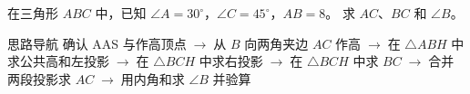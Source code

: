 \documentclass{exam-zh}
\begin{document}




\begin{eduProblemBlock}[例题]
\noindent
\begin{minipage}[t]{\dimexpr\linewidth-70mm-6mm\relax}
\vspace{0pt}
在三角形 $ABC$ 中，已知 $\angle A=30^\circ$，$\angle C=45^\circ$，$AB=8$。
求 $AC$、$BC$ 和 $\angle B$。

\end{minipage}\hfill
\begin{diagramcoltikz}{70mm}{圈出 $A,C$ 两个已知角，观察唯一未给角的顶点是哪一个。}
}
\end{diagramcoltikz}
\end{eduProblemBlock}





\begin{eduAuxItem}{思路导航}
确认 AAS 与作高顶点$\;\to\;$从 $B$ 向两角夹边 $AC$ 作高$\;\to\;$在 $\triangle ABH$ 中求公共高和左投影$\;\to\;$在 $\triangle BCH$ 中求右投影$\;\to\;$在 $\triangle BCH$ 中求 $BC$$\;\to\;$合并两段投影求 $AC$$\;\to\;$用内角和求 $\angle B$ 并验算\end{eduAuxItem}
\end{document}
